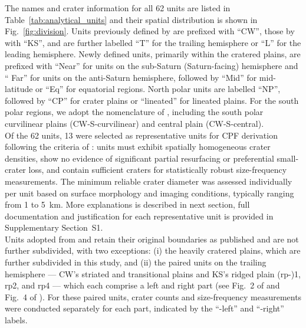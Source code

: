\documentclass[preprint,11pt,3p,times,authoryear]{elsarticle}
\begin{document}
The names and crater information for all 62 units are listed in Table~\ref{tab:analytical_units} and their spatial distribution is shown in Fig.~\ref{fig:division}. Units previously defined by \citet{CrowWillard2015} are prefixed with ``CW'', those by \citet{Kirchoff2009} with ``KS'', and are further labelled ``T'' for the trailing hemisphere or ``L'' for the leading hemisphere. Newly defined units, primarily within the cratered plains, 
are prefixed with ``Near'' for units on the sub-Saturn (Saturn-facing) hemisphere  and `` Far'' for units on the anti-Saturn hemisphere,
followed by ``Mid'' for mid-latitude or ``Eq'' for equatorial regions. North polar units are labelled ``NP'', followed by ``CP'' for crater plains or ``lineated'' for lineated plains. For the south polar regions, we adopt the nomenclature of \citet{CrowWillard2015}, including the south polar curvilinear plains (CW-S-curvilinear) and central plain (CW-S-central).\\

Of the 62 units, 13 were selected as representative units for CPF derivation following the criteria of \citet{Neukum1983}: units must exhibit spatially homogeneous crater densities, show no evidence of significant partial resurfacing or preferential small-crater loss, and contain sufficient craters for statistically robust size-frequency measurements. The minimum reliable crater diameter was assessed individually per unit based on surface morphology and imaging conditions, typically ranging from 1 to 5~km. More explanations is described in next section, full documentation and justification for each representative unit is provided in Supplementary Section~S1.\\

Units adopted from \citet{CrowWillard2015} and \citet{Kirchoff2009} retain their original boundaries as published and are not further subdivided, with two exceptions: (i) the heavily cratered plains, which are further subdivided in this study, and (ii) the paired units on the trailing hemisphere --- CW's striated and transitional plains and KS's ridged plain (rp-)1, rp2, and rp4 --- which each comprise a left and right part (see Fig.~2 of \citealt{CrowWillard2015} and Fig.~4 of \citealt{Kirchoff2009}). For these paired units, crater counts and size-frequency measurements were conducted separately for each part, indicated by the ``-left'' 
and ``-right'' labels. \\
\end{document}
